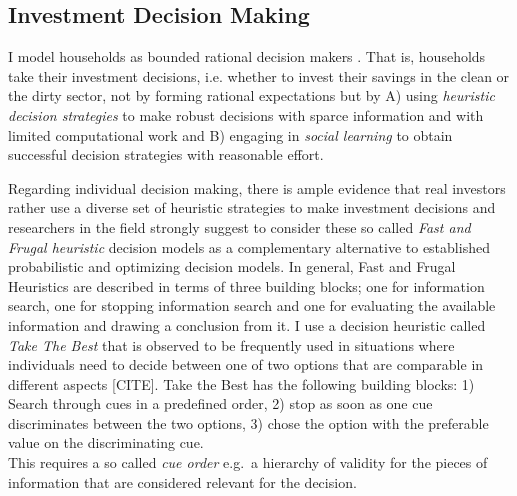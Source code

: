 \subsection{Investment Decision Making}
\label{sec:investment_decision_making}
I model households as bounded rational decision makers \cite{simon1972theories, simon1982models, gigerenzer2002bounded}.
That is, households take their investment decisions, i.e. whether to invest their savings in the clean or the dirty sector, not by forming rational expectations \cite{Evans2006, Kirman2014} but by A) using \emph{heuristic decision strategies} to make robust decisions with sparce information and with limited computational work and B) engaging in \emph{social learning} \cite{Bandura1971} to obtain successful decision strategies \cite{Traulsen2010} with reasonable effort.

Regarding individual decision making, there is ample evidence that real investors rather use a diverse set of heuristic strategies to make investment decisions \cite{Gigerenzer2018} and researchers in the field strongly suggest to consider these so called \emph{Fast and Frugal heuristic} decision models as a complementary alternative to established probabilistic and optimizing decision models. 
In general, Fast and Frugal Heuristics are described in terms of three building blocks; one for information search, one for stopping information search and one for evaluating the available information and drawing a conclusion from it.
I use a decision heuristic called \emph{Take The Best} that is observed to be frequently used in situations where individuals need to decide between one of two options that are comparable in different aspects [CITE]. 
Take the Best has the following building blocks: 1) Search through cues in a predefined order, 2) stop as soon as one cue discriminates between the two options, 3) chose the option with the preferable value on the discriminating cue. \\
This requires a so called \textit{cue order} e.g.\ a hierarchy of validity for the pieces of information that are considered relevant for the decision. \\

